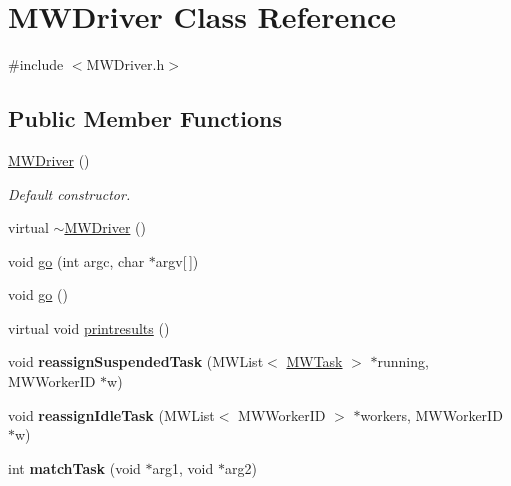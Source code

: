 \hypertarget{classMWDriver}{}\section{M\+W\+Driver Class Reference}
\label{classMWDriver}


{\ttfamily \#include $<$M\+W\+Driver.\+h$>$}

\subsection*{Public Member Functions}
\begin{DoxyCompactItemize}
\item 
\mbox{\label{classMWDriver_a5e0110a01075a9dfd3e93053b22f9ef0}} 
\hyperlink{classMWDriver_a5e0110a01075a9dfd3e93053b22f9ef0}{M\+W\+Driver} ()
\begin{DoxyCompactList}\small\item\em Default constructor. \end{DoxyCompactList}\item 
virtual \hyperlink{classMWDriver_a05b1dac7d50ff571c480ff386e6fcb30}{$\sim$\+M\+W\+Driver} ()
\item 
void \hyperlink{classMWDriver_a7e9140329e1c6a2b4b7f1a0a9a365cab}{go} (int argc, char $\ast$argv\mbox{[}$\,$\mbox{]})
\item 
void \hyperlink{classMWDriver_a4d3d2d8a2fac34f02c0573fabb29f1cf}{go} ()
\item 
virtual void \hyperlink{classMWDriver_a147074c64c2bf0883077a28432816947}{printresults} ()
\item 
\mbox{\label{classMWDriver_aca4f177690775ecc72820c67a88e66f7}} 
void {\bfseries reassign\+Suspended\+Task} (M\+W\+List$<$ \hyperlink{classMWTask}{M\+W\+Task} $>$ $\ast$running, M\+W\+Worker\+ID $\ast$w)
\item 
\mbox{\label{classMWDriver_a667ad4ad0017cd362835e7a89b43f061}} 
void {\bfseries reassign\+Idle\+Task} (M\+W\+List$<$ M\+W\+Worker\+ID $>$ $\ast$workers, M\+W\+Worker\+ID $\ast$w)
\item 
\mbox{\label{classMWDriver_aa7209348f0f9682935e191af9eb834b7}} 
int {\bfseries match\+Task} (void $\ast$arg1, void $\ast$arg2)
\item 
\mbox{\label{classMWDriver_ae1a927f51c31e6f31998965770b06c31}} 

\end{DoxyCompactItemize}
